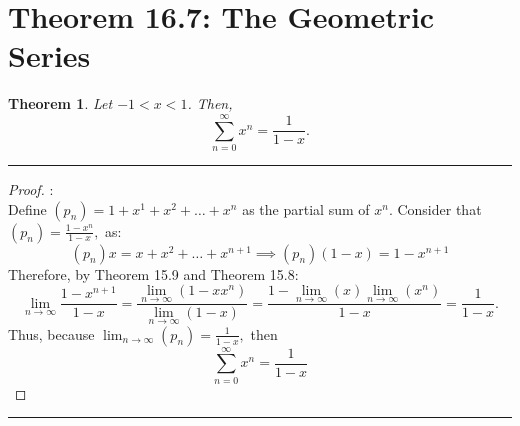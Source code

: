 \documentclass[openany, amssymb, psamsfonts]{amsart}
\newtheorem{thm}{Theorem}[section]
\theoremstyle{definition}
\numberwithin{equation}{section}
\begin{document}
\section*{Theorem 16.7: The Geometric Series}
\begin{thm}
\label{16.7}
	Let $-1 < x < 1$.  Then,
	\[
		\sum_{n = 0}^{\infty} x^n = \frac{1}{1 - x}.
	\]
\end{thm}
\vspace{4pt}     \hrule   \vspace{4pt}\begin{proof}:\\
Define $(p_n) = 1 + x^1 + x^2 + \dots + x^n$ as the partial sum of $x^n.$ Consider that $(p_n) = \frac{1 - x^n}{1-x},$ as:
\[(p_n)x = x + x^2 + \dots + x^{n+1}\implies (p_n)(1-x) = 1 - x^{n+1}\]
Therefore, by Theorem 15.9 and Theorem 15.8: \[\lim_{n\to \infty}\frac{1-x^{n+1}}{1-x} = \frac{\displaystyle\lim_{n\to \infty}(1-xx^n)}{\displaystyle\lim_{n\to \infty}(1-x)} = \frac{1-\displaystyle\lim_{n\to \infty}(x)\displaystyle\lim_{n\to \infty}(x^n)}{1-x} = \frac{1}{1-x}.\] Thus, because $\displaystyle\lim_{n \to \infty}(p_n) = \frac{1}{1-x},$ then \[\displaystyle\sum_{n=0}^\infty x^n = \frac{1}{1-x}\]
\end{proof}\vspace{4pt}     \hrule   \vspace{4pt}
\end{document}

